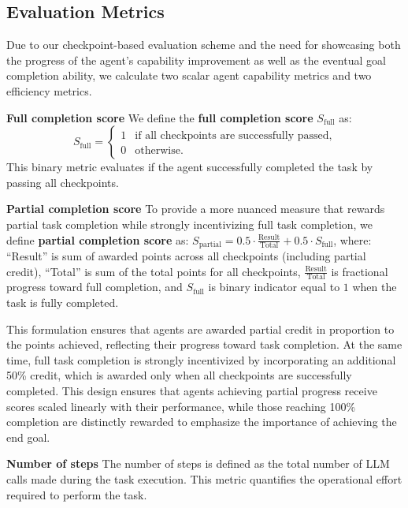 \documentclass{article}
\begin{document}
\subsection{Evaluation Metrics}
\label{sec:evalmetrics}
\vspace{-1mm}
Due to our checkpoint-based evaluation scheme and the need for showcasing both the progress of the agent's capability improvement as well as the eventual goal completion ability, we calculate two scalar agent capability metrics and two efficiency metrics.

\noindent \textbf{Full completion score} \quad
We define the \textbf{full completion score} \( S_{\text{full}} \) as:
\[
S_{\text{full}} = 
\begin{cases} 
1 & \text{if all checkpoints are successfully passed}, \\
0 & \text{otherwise}.
\end{cases}
\]
This binary metric evaluates if the agent successfully completed the task by passing all checkpoints.

\noindent \textbf{Partial completion score} \quad
To provide a more nuanced measure that rewards partial task completion while strongly incentivizing full task completion, we define \textbf{partial completion score} as:
$S_{\text{partial}} = 0.5 \cdot \frac{\text{Result}}{\text{Total}} + 0.5 \cdot S_{\text{full}}$, where:
``Result'' is sum of awarded points across all checkpoints (including partial credit), ``Total'' is sum of the total points for all checkpoints, \( \frac{\text{Result}}{\text{Total}} \) is fractional progress toward full completion, and \(S_{\text{full}}\) is binary indicator equal to \( 1 \) when the task is fully completed.

This formulation ensures that agents are awarded partial credit in proportion to the points achieved, reflecting their progress toward task completion. At the same time, full task completion is strongly incentivized by incorporating an additional 50\% credit, which is awarded only when all checkpoints are successfully completed. This design ensures that agents achieving partial progress receive scores scaled linearly with their performance, while those reaching 100\% completion are distinctly rewarded to emphasize the importance of achieving the end goal.

\noindent \textbf{Number of steps} \quad
The number of steps is defined as the total number of LLM calls made during the task execution. This metric quantifies the operational effort required to perform the task.
\end{document}
